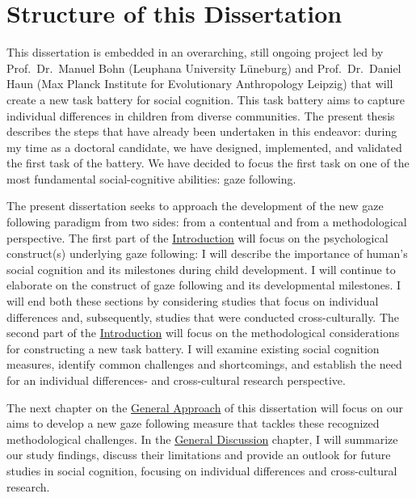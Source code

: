 \documentclass[
]{scrbook}
\begin{document}
\chapter*{Structure of this Dissertation}\label{structure}

This dissertation is embedded in an overarching, still ongoing project led by Prof.~Dr.~Manuel Bohn (Leuphana University Lüneburg) and Prof.~Dr.~Daniel Haun (Max Planck Institute for Evolutionary Anthropology Leipzig) that will create a new task battery for social cognition. This task battery aims to capture individual differences in children from diverse communities. The present thesis describes the steps that have already been undertaken in this endeavor: during my time as a doctoral candidate, we have designed, implemented, and validated the first task of the battery. We have decided to focus the first task on one of the most fundamental social-cognitive abilities: gaze following.

The present dissertation seeks to approach the development of the new gaze following paradigm from two sides: from a contentual and from a methodological perspective. The first part of the \hyperref[introduction]{Introduction} will focus on the psychological construct(s) underlying gaze following: I will describe the importance of human's social cognition and its milestones during child development. I will continue to elaborate on the construct of gaze following and its developmental milestones. I will end both these sections by considering studies that focus on individual differences and, subsequently, studies that were conducted cross-culturally. The second part of the \hyperref[introduction]{Introduction} will focus on the methodological considerations for constructing a new task battery. I will examine existing social cognition measures, identify common challenges and shortcomings, and establish the need for an individual differences- and cross-cultural research perspective.

The next chapter on the \hyperref[approach]{General Approach} of this dissertation will focus on our aims to develop a new gaze following measure that tackles these recognized methodological challenges. In the \hyperref[discussion]{General Discussion} chapter, I will summarize our study findings, discuss their limitations and provide an outlook for future studies in social cognition, focusing on individual differences and cross-cultural research.

\mainmatter
\end{document}
